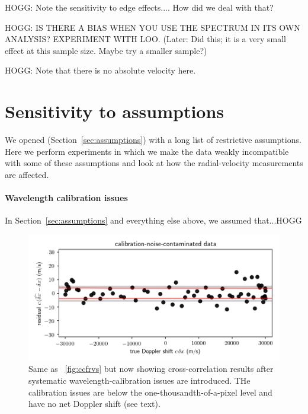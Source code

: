 \documentclass[modern]{aastex631}
\newcommand{\sectionname}{Section}
\newcommand{\secref}[1]{\sectionname~\ref{#1}}
\newcommand{\figref}[1]{\figurename~\ref{#1}}
\begin{document}
HOGG: Note the sensitivity to edge effects.... How did we deal with that?

HOGG: IS THERE A BIAS WHEN YOU USE THE SPECTRUM IN ITS OWN ANALYSIS? EXPERIMENT WITH LOO. (Later: Did this; it is a very small effect at this sample size. Maybe try a smaller sample?)

HOGG: Note that there is no absolute velocity here.

\section{Sensitivity to assumptions}\label{sec:sensitivity}

We opened (\secref{sec:assumptions}) with a long list of restrictive assumptions.
Here we perform experiments in which we make the data weakly incompatible with some of these assumptions and look at how the radial-velocity measurements are affected.

\noindent
\paragraph{Wavelength calibration issues}
In \secref{sec:assumptions} and everything else above, we assumed that...HOGG

\begin{figure}[tp]
  \begin{mdframed}
    \begin{center}
    \includegraphics[width=\textwidth]{../notebook/calibration.png}
    \end{center}
    \caption{Same as \figref{fig:ccfrvs} but now showing cross-correlation results after systematic wavelength-calibration issues are introduced. THe calibration issues are below the one-thousandth-of-a-pixel level and have no net Doppler shift (see text).\label{fig:calibration}}
  \end{mdframed}
\end{figure}
\end{document}
